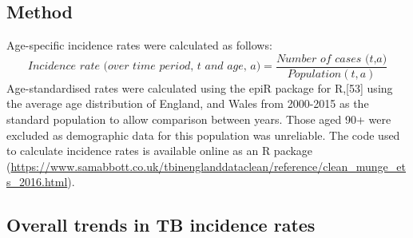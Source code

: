 \documentclass[11pt,twoside]{bristolthesis}
\begin{document}
  \hypertarget{method-1}{%
  \subsection{Method}\label{method-1}}
  
  Age-specific incidence rates were calculated as follows:
  \begin{equation} 
    \textit{Incidence rate (over time period, t and age, a)} = \frac{\textit{Number of cases (t,a)}}{Population(t, a)}
    \label{eq:incEq}
  \end{equation}
  Age-standardised rates were calculated using the epiR package for R,{[}53{]} using the average age distribution of England, and Wales from 2000-2015 as the standard population to allow comparison between years. Those aged 90+ were excluded as demographic data for this population was unreliable. The code used to calculate incidence rates is available online as an R package (\url{https://www.samabbott.co.uk/tbinenglanddataclean/reference/clean_munge_ets_2016.html}).
  
  \hypertarget{overall-trends-in-tb-incidence-rates}{%
  \subsection{Overall trends in TB incidence rates}\label{overall-trends-in-tb-incidence-rates}}
  
\end{document}
